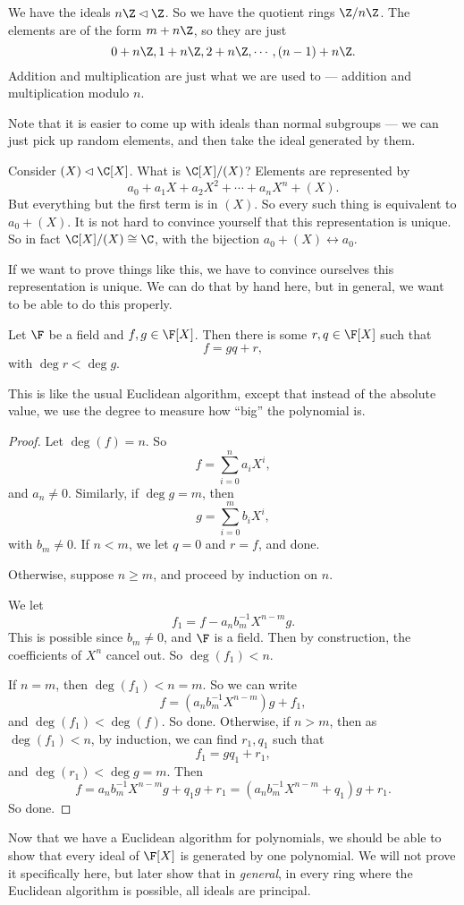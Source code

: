 \documentclass[a4paper]{article}
\begin{document}
\begin{eg}
  We have the ideals $n\Z \lhd \Z$. So we have the quotient rings $\Z / n\Z$. The elements are of the form $m + n\Z$, so they are just
  \[
    0 + n\Z, 1 + n\Z, 2 + n\Z, \cdots, (n - 1) + n\Z.
  \]
  Addition and multiplication are just what we are used to --- addition and multiplication modulo $n$.
\end{eg}

Note that it is easier to come up with ideals than normal subgroups --- we can just pick up random elements, and then take the ideal generated by them.
\begin{eg}
  Consider $(X) \lhd \C[X]$. What is $\C[X]/(X)$? Elements are represented by
  \[
    a_0 + a_1 X + a_2 X^2 + \cdots + a_n X^n + (X).
  \]
  But everything but the first term is in $(X)$. So every such thing is equivalent to $a_0 + (X)$. It is not hard to convince yourself that this representation is unique. So in fact $\C[X]/(X) \cong \C$, with the bijection $a_0 + (X) \leftrightarrow a_0$.
\end{eg}
If we want to prove things like this, we have to convince ourselves this representation is unique. We can do that by hand here, but in general, we want to be able to do this properly.

\begin{prop}
  Let $\F$ be a field and $f, g \in \F[X]$. Then there is some $r, q \in \F[X]$ such that
  \[
    f = gq + r,
  \]
  with $\deg r < \deg g$.
\end{prop}
This is like the usual Euclidean algorithm, except that instead of the absolute value, we use the degree to measure how ``big'' the polynomial is.

\begin{proof}
  Let $\deg (f) = n$. So
  \[
    f = \sum_{i = 0}^n a_i X^i,
  \]
  and $a_n \not= 0$. Similarly, if $\deg g = m$, then
  \[
    g = \sum_{i = 0}^m b_i X^i,
  \]
  with $b_m \not= 0$. If $n < m$, we let $q = 0$ and $r = f$, and done.

  Otherwise, suppose $n \geq m$, and proceed by induction on $n$.

  We let
  \[
    f_1 = f - a_n b_m^{-1} X^{n - m} g.
  \]
  This is possible since $b_m \not= 0$, and $\F$ is a field. Then by construction, the coefficients of $X^n$ cancel out. So $\deg (f_1) < n$.

  If $n = m$, then $\deg (f_1) < n = m$. So we can write
  \[
    f = (a_n b_m^{-1} X^{n - m})g + f_1,
  \]
  and $\deg(f_1) < \deg(f)$. So done. Otherwise, if $n > m$, then as $\deg(f_1) < n$, by induction, we can find $r_1, q_1$ such that
  \[
    f_1 = g q_1 + r_1,
  \]
  and $\deg (r_1) < \deg g = m$. Then
  \[
    f = a_nb_m^{-1} X^{n - m} g + q_1 g + r_1 = (a_n b_m^{-1}X^{n - m} + q_1) g + r_1.
  \]
  So done.
\end{proof}
Now that we have a Euclidean algorithm for polynomials, we should be able to show that every ideal of $\F[X]$ is generated by one polynomial. We will not prove it specifically here, but later show that in \emph{general}, in every ring where the Euclidean algorithm is possible, all ideals are principal.
\end{document}
